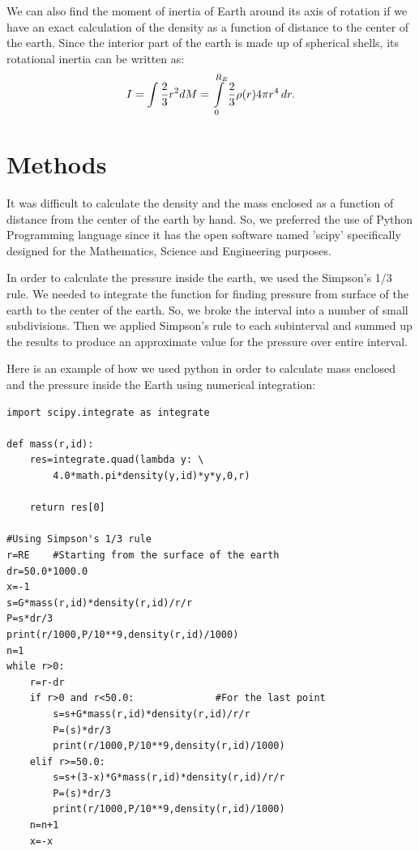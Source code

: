 \documentclass[12pt]{article}
\begin{document}
We can also find the moment of inertia of Earth around its axis of rotation if we have an exact calculation of the density as a function of distance to the center of the earth. Since the interior part of the earth is made up of spherical shells, its rotational inertia can be written as:
\begin{equation}
I=\int\\\frac{2}{3} r^2dM = \int\limits_0^{R_E} \\\frac{2}{3}\rho(r)4 \pi r^4 \,dr .
\end{equation}

\section{Methods}
It was difficult to calculate the density and the mass enclosed as a function of distance from the center of the earth by hand. So, we preferred the use of Python Programming language since it has the open software named 'scipy' specifically designed for the Mathematics, Science and Engineering purposes.

In order to calculate the pressure inside the earth, we used the Simpson's 1/3 rule. We needed to integrate the function for finding pressure from surface of the earth to the center of the earth. So, we broke the interval into a number of small subdivisions. Then we applied Simpson's rule to each subinterval and summed up the results to produce an approximate value for the pressure over entire interval.

Here is an example of how we used python in order to calculate mass enclosed and the pressure inside the Earth using numerical integration:
{\small
\begin{lstlisting}
import scipy.integrate as integrate

def mass(r,id):
	res=integrate.quad(lambda y: \
	    4.0*math.pi*density(y,id)*y*y,0,r)
	
	return res[0]

#Using Simpson's 1/3 rule
r=RE    #Starting from the surface of the earth
dr=50.0*1000.0
x=-1
s=G*mass(r,id)*density(r,id)/r/r    
P=s*dr/3
print(r/1000,P/10**9,density(r,id)/1000)
n=1
while r>0:
    r=r-dr 
    if r>0 and r<50.0:              #For the last point
        s=s+G*mass(r,id)*density(r,id)/r/r
        P=(s)*dr/3
        print(r/1000,P/10**9,density(r,id)/1000)
    elif r>=50.0:
        s=s+(3-x)*G*mass(r,id)*density(r,id)/r/r
        P=(s)*dr/3 
        print(r/1000,P/10**9,density(r,id)/1000)
    n=n+1
    x=-x
\end{lstlisting}
}
\end{document}
